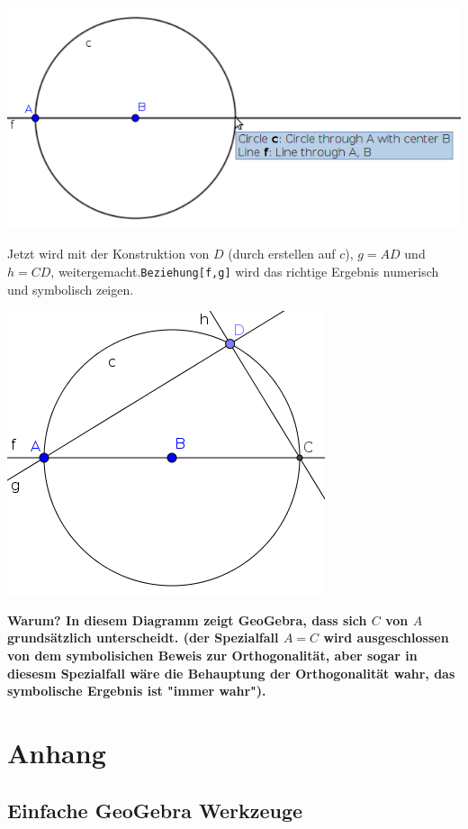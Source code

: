 \documentclass{article}
\begin{document}
\begin{enumerate}
\begin{enumerate}
\begin{center}
\includegraphics[scale=0.5]{limitations-Thales2-3}
\end{center}
      Jetzt wird mit der Konstruktion von  $D$ (durch erstellen auf $c$), $g=AD$ und $h=CD$, weitergemacht.\texttt{Beziehung[f,g]} wird das richtige Ergebnis numerisch und symbolisch zeigen.
\begin{center}
\includegraphics[scale=0.5]{limitations-Thales2-4}
\end{center}
      \textbf{Warum? In diesem Diagramm zeigt GeoGebra, dass sich $C$ von $A$ grundsätzlich unterscheidt. (der Spezialfall $A=C$ wird ausgeschlossen von dem symbolisichen Beweis zur Orthogonalität, aber sogar in diesesm Spezialfall wäre die Behauptung der Orthogonalität wahr, das symbolische Ergebnis ist "immer wahr").}
    \end{enumerate}
\end{enumerate}


\section{Anhang}
\subsection{Einfache GeoGebra Werkzeuge}
\end{document}
